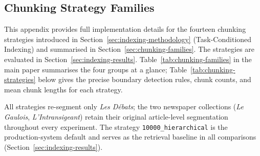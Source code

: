\subsection{Chunking Strategy Families}
\label{sec:appendix-chunking-families}

This appendix provides full implementation details for the fourteen chunking
strategies introduced in Section~\ref{sec:indexing-methodology}
(Task-Conditioned Indexing) and summarised in Section~\ref{sec:chunking-families}.
The strategies are evaluated in Section~\ref{sec:indexing-results}.
Table~\ref{tab:chunking-families} in the main paper summarises the four groups at
a glance; Table~\ref{tab:chunking-strategies} below gives the precise boundary
detection rules, chunk counts, and mean chunk lengths for each strategy.

All strategies re-segment only \textit{Les Débats}; the two newspaper collections
(\textit{Le Gaulois}, \textit{L'Intransigeant}) retain their original
article-level segmentation throughout every experiment.
The strategy \texttt{10000\_hierarchical} is the production-system default and
serves as the retrieval baseline in all comparisons
(Section~\ref{sec:indexing-results}).



